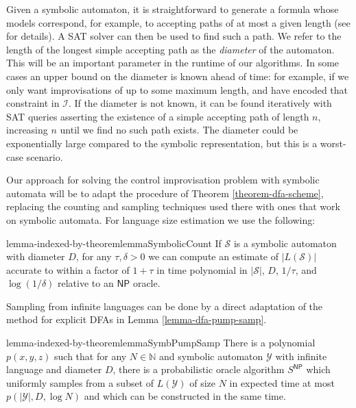 \documentclass[a4paper,USenglish,numberwithinsect]{lipics}
\theoremstyle{plain}
\theoremstyle{definition}
\newcommand{\N}{\mathbb{N}}
\newcommand{\NP}{\ensuremath{\mathsf{NP}}}
\newcommand{\improvs}{I}
\begin{document}
Given a symbolic automaton, it is straightforward to generate a
formula whose models correspond, for example, to accepting paths of at
most a given length (see \cite{bmc} for details). A SAT solver can
then be used to find such a path. We refer to the length of the
longest simple accepting path as the \emph{diameter} of the
automaton. This will be an important parameter in the runtime of our
algorithms. In some cases an upper bound on the diameter is known
ahead of time: for example, if we only want improvisations of up to
some maximum length, and have encoded that constraint in
$\mathcal{\improvs}$. If the diameter is not known, it can be found
iteratively with SAT queries asserting the existence of a simple
accepting path of length $n$, increasing $n$ until we find no such
path exists. The diameter could be exponentially large compared to the
symbolic representation, but this is a worst-case scenario. 

Our approach for solving the control improvisation problem with symbolic automata will be to adapt the procedure of Theorem \ref{theorem-dfa-scheme}, replacing the counting and sampling techniques used there with ones that work on symbolic automata. For language size estimation we use the following:
\begin{restatable}{lemma-indexed-by-theorem}{lemmaSymbolicCount} \label{lemma:symbolic-count}
If $\mathcal{S}$ is a symbolic automaton with diameter $D$, for any $\tau, \delta > 0$ we can compute an estimate of $|L(\mathcal{S})|$ accurate to within a factor of $1+\tau$ in time polynomial in $|\mathcal{S}|$, $D$, $1/\tau$, and $\log(1/\delta)$ relative to an {\NP} oracle.
\end{restatable}

Sampling from infinite languages can be done by a direct adaptation of the method for explicit DFAs in Lemma \ref{lemma-dfa-pump-samp}.
\begin{restatable}{lemma-indexed-by-theorem}{lemmaSymbPumpSamp} \label{lemma:symb-pump-samp}
There is a polynomial $p(x,y,z)$ such that for any $N \in \N$ and symbolic automaton $\mathcal{Y}$ with infinite language and diameter $D$, there is a probabilistic oracle algorithm $S^{\NP}$ which uniformly samples from a subset of $L(\mathcal{Y})$ of size $N$ in expected time at most $p(|\mathcal{Y}|, D, \log N)$ and which can be constructed in the same time.
\end{restatable}
\end{document}
